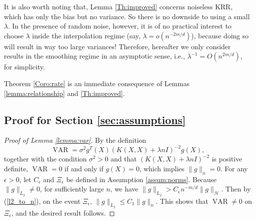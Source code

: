 \documentclass[12pt]{article}
\theoremstyle{plain}
\theoremstyle{remark}
\begin{document}
It is also worth noting that, Lemma \ref{Th:improved} concerns noiseless KRR, which has only the bias but no variance. So there is no downside to using a small $\lambda$. In the presence of random noise, however, it is of no practical interest to choose $\lambda$ inside the interpolation regime (say, $\lambda=o(n^{-2m/d})$), because doing so will result in way too large variances! Therefore, hereafter we only consider results in the smoothing regime in an asymptotic sense, i.e., $\lambda^{-1}=O(n^{2m/d})$, for simplicity.

 Theorem \ref{Coro:rate} is an immediate consequence of Lemmas \ref{lemma:relationship} and \ref{Th:improved}.



\subsection{Proof for Section \ref{sec:assumptions}} \label{sub:general_assum}
\begin{proof}[Proof of Lemma \ref{lemma:var}]
By the definition
\[\operatorname{VAR}=\sigma^2g^T(X)(K(X,X)+\lambda n I)^{-2}g(X),\]
together with the condition $\sigma^2>0$ and that $(K(X,X)+\lambda n I)^{-2}$ is positive definite,
$\operatorname{VAR}=0$ if and only if $g(X)=0$, which implies $\|g\|_n=0$.
For any $\epsilon>0$, let $C_\epsilon$ and $\Xi_\epsilon$ be defined in Assumption \ref{assum:norms}. Because $\|g\|_{L_2}\neq 0$, for sufficiently large $n$, we have $\|g\|_{L_2}>C_\epsilon n^{-m/d}\|g\|_\mathcal{H}$. Then by (\ref{l2_to_n}), on the event $\Xi_\epsilon$, $\|g\|_{L_2}\leq C_1\|g\|_n$. This shows that $\operatorname{VAR}\neq 0$ on $\Xi_\epsilon$, and the desired result follows.
\end{proof}

\end{document}

